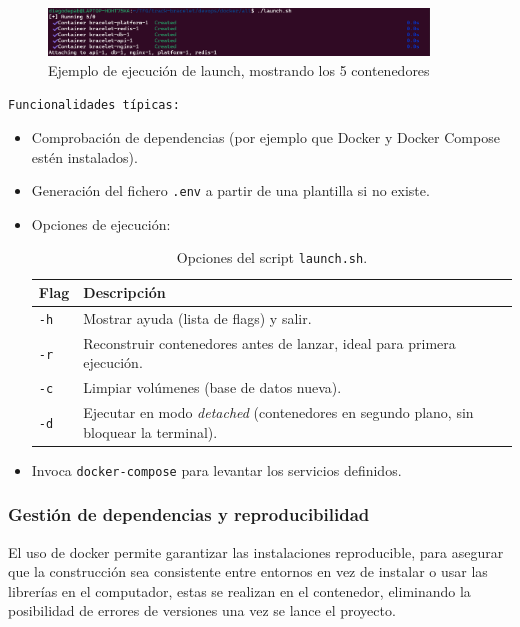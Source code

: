 \documentclass[12pt, a4paper]{article}
\begin{document}
\begin{figure}[htbp]
	\centering
	\includegraphics[width=0.9\textwidth]{images/ejemplo_launch.png}
	\caption[launch]{Ejemplo de ejecución de launch, mostrando los 5 contenedores}
	\label{fig:launch}
\end{figure}

\texttt{Funcionalidades típicas:}
\begin{itemize}
	\item Comprobación de dependencias (por ejemplo que Docker y Docker Compose estén instalados).
	\item Generación del fichero \texttt{.env} a partir de una plantilla si no existe.
	\item Opciones de ejecución:
	
	\begin{table}[ht]
		\centering
		\begin{tabular}{@{}ll@{}}
			\toprule
			\textbf{Flag} & \textbf{Descripción} \\
			\midrule
			\texttt{-h} & Mostrar ayuda (lista de flags) y salir. \\
			\texttt{-r} & Reconstruir contenedores antes de lanzar, ideal para primera ejecución. \\
			\texttt{-c} & Limpiar volúmenes (base de datos nueva). \\
			\texttt{-d} & Ejecutar en modo \emph{detached} (contenedores en segundo plano, sin bloquear la terminal). \\
			\bottomrule
		\end{tabular}
		\caption{Opciones del script \texttt{launch.sh}.}
		\label{tab:launch_flags}
	\end{table}
	
	\item Invoca \texttt{docker-compose} para levantar los servicios definidos.
\end{itemize}

\subsubsection{Gestión de dependencias y reproducibilidad}

El uso de docker permite garantizar las instalaciones reproducible, para asegurar que la construcción sea consistente entre entornos en vez de instalar o usar las librerías en el computador, estas se realizan en el contenedor, eliminando la posibilidad de errores de versiones una vez se lance el proyecto.
\end{document}
